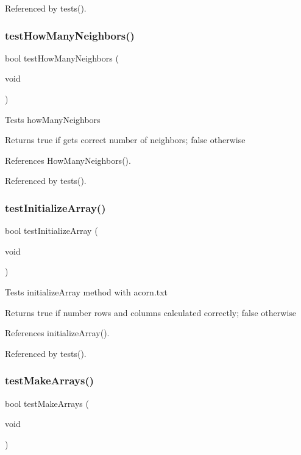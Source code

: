 Referenced by tests().

\mbox{\label{tests_8c_a61a9bf4e92f96b3669a4eb9c2af3eca9}} 
\subsubsection{test\+How\+Many\+Neighbors()}
{\footnotesize\ttfamily bool test\+How\+Many\+Neighbors (\begin{DoxyParamCaption}\item[{void}]{ }\end{DoxyParamCaption})}

Tests how\+Many\+Neighbors \begin{DoxyReturn}{Returns}
true if gets correct number of neighbors; false otherwise 
\end{DoxyReturn}


References How\+Many\+Neighbors().



Referenced by tests().

\mbox{\label{tests_8c_a923315476fce6d67e320586093081ded}} 
\subsubsection{test\+Initialize\+Array()}
{\footnotesize\ttfamily bool test\+Initialize\+Array (\begin{DoxyParamCaption}\item[{void}]{ }\end{DoxyParamCaption})}

Tests initialize\+Array method with acorn.\+txt \begin{DoxyReturn}{Returns}
true if number rows and columns calculated correctly; false otherwise 
\end{DoxyReturn}


References initialize\+Array().



Referenced by tests().

\mbox{\label{tests_8c_af6e338851f3ccb4714e1bfb06ec4b428}} 
\subsubsection{test\+Make\+Arrays()}
{\footnotesize\ttfamily bool test\+Make\+Arrays (\begin{DoxyParamCaption}\item[{void}]{ }\end{DoxyParamCaption})}

